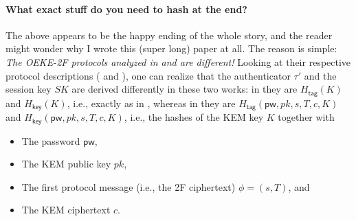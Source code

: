 \documentclass{article}
\theoremstyle{plain}
\theoremstyle{definition}
\theoremstyle{remark}
\newcommand{\Hkey}{H_\mathsf{key}}
\newcommand{\Htag}{H_\mathsf{tag}}
\newcommand{\pw}{\mathsf{pw}}
\begin{document}
\paragraph{What exact stuff do you need to hash at the end?}
The above appears to be the happy ending of the whole story, and the reader might wonder why I wrote this (super long) paper at all. The reason is simple: \emph{The OEKE-2F protocols analyzed in \cite{EC:JanRoyXu25} and \cite{EPRINT:ArrBarJar25} are different!} Looking at their respective protocol descriptions (\cite[Figure~19]{EC:JanRoyXu25} and \cite[Fig.4]{EPRINT:ArrBarJar25}), one can realize that the authenticator $\tau'$ and the session key $SK$ are derived differently in these two works: in \cite{EC:JanRoyXu25} they are $\Htag(K)$ and $\Hkey(K)$, i.e., exactly as in , whereas in \cite{EPRINT:ArrBarJar25} they are $\Htag(\pw,pk,s,T,c,K)$ and $\Hkey(\pw,pk,s,T,c,K)$, i.e., the hashes of the KEM key $K$ together with
\begin{itemize}
  \item The password $\pw$,
  \item The KEM public key $pk$,
  \item The first protocol message (i.e., the 2F ciphertext) $\phi = (s,T)$, and
  \item The KEM ciphertext $c$.
\end{itemize}
\end{document}
